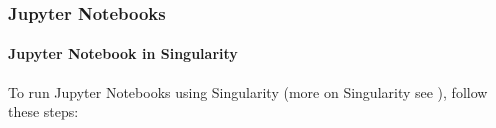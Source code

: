 \subsubsection{Jupyter Notebooks}
\label{sect:jupyter}

\paragraph{Jupyter Notebook in Singularity}
\label{sect:jupyter-singularity}

To run Jupyter Notebooks using Singularity (more on Singularity see ), follow these steps:

